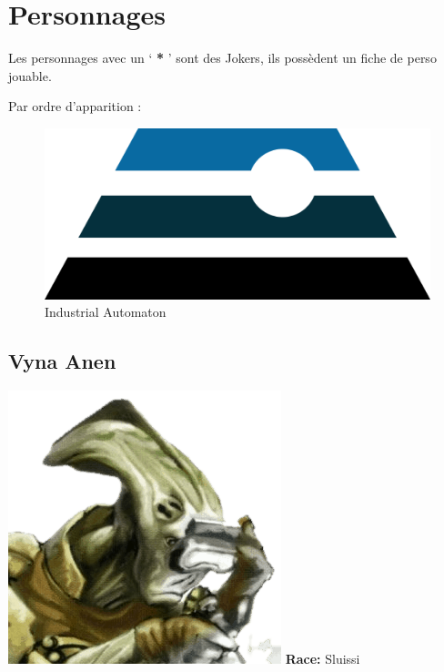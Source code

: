\section{Personnages}
Les personnages avec un ‘ \textbf{*} ’ sont des Jokers, ils possèdent un fiche de perso jouable. 

Par ordre d'apparition :

\begin{figure}[h!]
    \centering
    \includegraphics[width=\linewidth]{_img/dos-au-muur/industrial-automaton.png}
    \caption{Industrial Automaton}
\end{figure}

\newpage
\subsection{Vyna Anen} \label{sec:vyna-anen}
\noindent\includegraphics[width=\linewidth]{_img/dos-au-muur/vyna-anen.png}
\textbf{Race:} Sluissi

